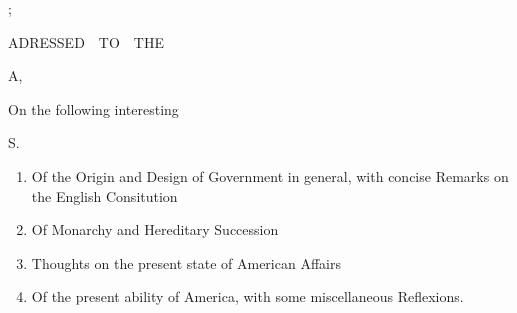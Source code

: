 \documentclass[12pt, twocolumn]{book}
\begin{document}
    \clearpage

    \begin{titlepage}
        \begin{center}
        
            {\fontsize{46pt}{4pt} \selectfont {};}

            \vspace*{1cm}

            {\scriptsize \lsstyle ADRESSED$\quad$TO$\quad$THE}

            \vspace*{1.2cm}

            {\fontsize{36pt}{4pt} \selectfont {}}

            \vspace*{1cm}

            {\small {}}

            \vspace*{1cm}

            {\fontsize{38pt}{4pt} \selectfont {}A,}

            \vspace*{1cm}

            {\small On the following interesting}

            \vspace*{1cm}

            {\LARGE {} S.}

            \vspace*{0.7cm}

            {\begin{adjustwidth}{3em}{3em}
                \begin{enumerate}[I]
                    \setlength{\itemsep}{10pt}
                    \item Of the Origin and Design of Government in general, with concise Remarks on the English Consitution
                    \item Of Monarchy and Hereditary Succession
                    \item Thoughts on the present state of American Affairs
                    \item Of the present ability of America, with some miscellaneous Reflexions.
                \end{enumerate}
            \end{adjustwidth}}


\end{center}
\end{titlepage}
\end{document}
